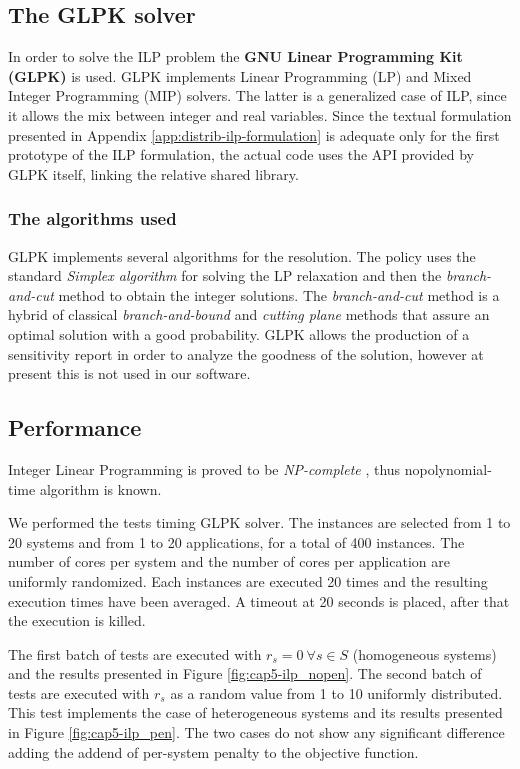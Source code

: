 \subsection{The GLPK solver}
In order to solve the ILP problem the
\textbf{GNU Linear Programming Kit (GLPK)}
\cite{makhorin2008glpk} is used. GLPK implements Linear Programming (LP) and
Mixed Integer Programming (MIP) solvers. The latter is a generalized case of 
ILP, since it allows the mix between integer and real variables. Since the
textual formulation presented in Appendix \ref{app:distrib-ilp-formulation}
is adequate
only for the first prototype of the ILP formulation, the actual code uses the 
API provided by GLPK itself, linking the relative shared library.

\subsubsection{The algorithms used}
GLPK implements several algorithms for the resolution. The policy uses the
standard \emph{Simplex algorithm} for solving the LP relaxation and then the
\emph{branch-and-cut} method \cite{mitchell2011branch} to obtain the integer
solutions. The \emph{branch-and-cut} method is a hybrid of classical
\emph{branch-and-bound} and \emph{cutting plane} methods that assure an
optimal solution with a good probability. GLPK allows the production of a 
sensitivity report in order to analyze the goodness of the solution, however
at present this is not used in our software.

\subsection{Performance}

Integer Linear Programming is proved to be \emph{NP-complete}
\cite{papadimitriou1981complexity}, thus no\linebreak polynomial-time
algorithm is known.

We performed the tests timing GLPK solver.
The instances are selected from 1 to 20 systems and from 1 to 20 applications,
for a total of 400 instances. The number of cores per system and the number
of cores per application are uniformly randomized. Each instances are executed
20 times and the resulting execution times have been averaged. A timeout at
20 seconds is placed, after that the execution is killed.

The first batch of tests are executed with \(r_s=0\ \forall s \in S\)
(homogeneous systems) and the results presented in Figure
\ref{fig:cap5-ilp_nopen}. The second batch
of tests are executed with \( r_s \) as a random value from 1 to 10
uniformly distributed. This test implements the case of heterogeneous systems and its results presented in Figure 
\ref{fig:cap5-ilp_pen}.
The two cases do not show any significant difference adding the addend of
per-system penalty to the objective function.


